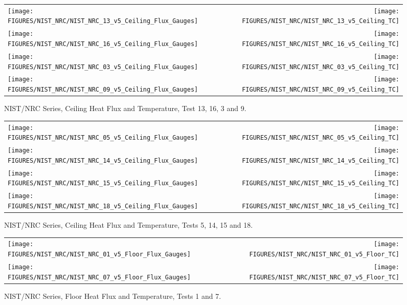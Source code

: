 \begin{figure}[p]
\begin{tabular*}{\textwidth}{l@{\extracolsep{\fill}}r}
\texttt{[image: FIGURES/NIST\_NRC/NIST\_NRC\_13\_v5\_Ceiling\_Flux\_Gauges]} &
\texttt{[image: FIGURES/NIST\_NRC/NIST\_NRC\_13\_v5\_Ceiling\_TC]} \\
\texttt{[image: FIGURES/NIST\_NRC/NIST\_NRC\_16\_v5\_Ceiling\_Flux\_Gauges]} &
\texttt{[image: FIGURES/NIST\_NRC/NIST\_NRC\_16\_v5\_Ceiling\_TC]} \\
\texttt{[image: FIGURES/NIST\_NRC/NIST\_NRC\_03\_v5\_Ceiling\_Flux\_Gauges]} &
\texttt{[image: FIGURES/NIST\_NRC/NIST\_NRC\_03\_v5\_Ceiling\_TC]} \\
\texttt{[image: FIGURES/NIST\_NRC/NIST\_NRC\_09\_v5\_Ceiling\_Flux\_Gauges]} &
\texttt{[image: FIGURES/NIST\_NRC/NIST\_NRC\_09\_v5\_Ceiling\_TC]}

\end{tabular*}
\caption{NIST/NRC Series, Ceiling Heat Flux and Temperature, Test 13, 16, 3 and 9.}
\label{NIST_NRC_Ceiling_3}
\end{figure}

\begin{figure}[p]
\begin{tabular*}{\textwidth}{l@{\extracolsep{\fill}}r}
\texttt{[image: FIGURES/NIST\_NRC/NIST\_NRC\_05\_v5\_Ceiling\_Flux\_Gauges]} &
\texttt{[image: FIGURES/NIST\_NRC/NIST\_NRC\_05\_v5\_Ceiling\_TC]} \\
\texttt{[image: FIGURES/NIST\_NRC/NIST\_NRC\_14\_v5\_Ceiling\_Flux\_Gauges]} &
\texttt{[image: FIGURES/NIST\_NRC/NIST\_NRC\_14\_v5\_Ceiling\_TC]} \\
\texttt{[image: FIGURES/NIST\_NRC/NIST\_NRC\_15\_v5\_Ceiling\_Flux\_Gauges]} &
\texttt{[image: FIGURES/NIST\_NRC/NIST\_NRC\_15\_v5\_Ceiling\_TC]} \\
\texttt{[image: FIGURES/NIST\_NRC/NIST\_NRC\_18\_v5\_Ceiling\_Flux\_Gauges]} &
\texttt{[image: FIGURES/NIST\_NRC/NIST\_NRC\_18\_v5\_Ceiling\_TC]}
\end{tabular*}
\caption{NIST/NRC Series, Ceiling Heat Flux and Temperature, Tests 5, 14, 15 and 18.}
\label{NIST_NRC_Ceiling_4}
\end{figure}

\clearpage


\begin{figure}[h!]
\begin{tabular*}{\textwidth}{l@{\extracolsep{\fill}}r}
\texttt{[image: FIGURES/NIST\_NRC/NIST\_NRC\_01\_v5\_Floor\_Flux\_Gauges]} &
\texttt{[image: FIGURES/NIST\_NRC/NIST\_NRC\_01\_v5\_Floor\_TC]} \\
\texttt{[image: FIGURES/NIST\_NRC/NIST\_NRC\_07\_v5\_Floor\_Flux\_Gauges]} &
\texttt{[image: FIGURES/NIST\_NRC/NIST\_NRC\_07\_v5\_Floor\_TC]}

\end{tabular*}
\caption{NIST/NRC Series, Floor Heat Flux and Temperature, Tests 1 and 7.}
\label{NIST_NRC_Floor_1}
\end{figure}


